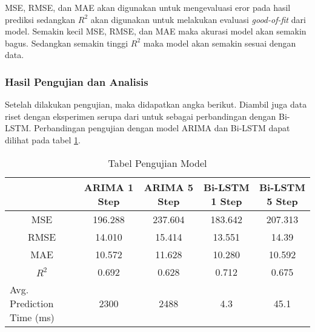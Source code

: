 MSE, RMSE, dan MAE akan digunakan untuk mengevaluasi eror pada hasil prediksi sedangkan $R^{2}$ akan digunakan untuk melakukan evaluasi \textit{good-of-fit} dari model. Semakin kecil MSE, RMSE, dan MAE maka akurasi model akan semakin bagus. Sedangkan semakin tinggi $R^{2}$ maka model akan semakin sesuai dengan data.

\subsubsection{Hasil Pengujian dan Analisis}

Setelah dilakukan pengujian, maka didapatkan angka berikut. Diambil juga data riset dengan eksperimen serupa dari \parencite{riset1} untuk sebagai perbandingan dengan Bi-LSTM. Perbandingan pengujian dengan model ARIMA dan Bi-LSTM  dapat dilihat pada tabel \ref{tab:pengujian-model-arima-bilstm}.

\begin{longtable}{|p{0.8in}|p{0.5in}|p{0.5in}|p{0.5in}|p{0.5in}|}

    \caption{Tabel Pengujian Model} \label{tab:pengujian-model-arima-bilstm} \\

    \hline
    \rowcolor{gray!30}\multicolumn{1}{|c|}{\textbf{Metrik}} & \multicolumn{1}{|c|}{\textbf{ARIMA 1 Step}} & \multicolumn{1}{|c|}{\textbf{ARIMA 5 Step}} & \multicolumn{1}{|c|}{\textbf{Bi-LSTM 1 Step}} & \multicolumn{1}{|c|}{\textbf{Bi-LSTM 5 Step}} \\
    \hline
    \endfirsthead
    \endhead
    \multicolumn{1}{|c|}{MSE} & \multicolumn{1}{|c|}{196.288} & \multicolumn{1}{|c|}{237.604} & \multicolumn{1}{|c|}{183.642} & \multicolumn{1}{|c|}{207.313} \tabularnewline \hline

    \multicolumn{1}{|c|}{RMSE} & \multicolumn{1}{|c|}{14.010} & \multicolumn{1}{|c|}{15.414} & \multicolumn{1}{|c|}{13.551} & \multicolumn{1}{|c|}{14.39} \tabularnewline \hline

    \multicolumn{1}{|c|}{MAE} & \multicolumn{1}{|c|}{10.572} & \multicolumn{1}{|c|}{11.628} & \multicolumn{1}{|c|}{10.280} & \multicolumn{1}{|c|}{10.592} \tabularnewline \hline

    \multicolumn{1}{|c|}{$R^{2}$} & \multicolumn{1}{|c|}{0.692} & \multicolumn{1}{|c|}{0.628} & \multicolumn{1}{|c|}{0.712} & \multicolumn{1}{|c|}{0.675} \tabularnewline \hline

    Avg. Prediction Time (ms) & \multicolumn{1}{|c|}{2300} & \multicolumn{1}{|c|}{2488} & \multicolumn{1}{|c|}{4.3} & \multicolumn{1}{|c|}{45.1} \tabularnewline

    \hline
\end{longtable}

